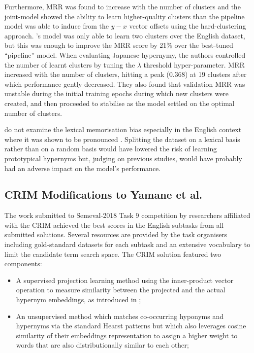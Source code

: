 Furthermore, \ac{MRR} was found to increase with the number of clusters and the joint-model showed the ability to learn higher-quality clusters than the pipeline model was able to induce from the $y-x$ vector offsets using the hard-clustering approach.  \citeauthor{yamane2016distributional}'s model was only able to learn two clusters over the English dataset, but this was enough to improve the \ac{MRR} score by 21\% over the best-tuned “pipeline” model.  When evaluating Japanese hypernymy, the authors controlled the number of learnt clusters by tuning the $\lambda$ threshold hyper-parameter.  \ac{MRR} increased with the number of clusters, hitting a peak (0.368) at 19 clusters after which performance gently decreased.  They also found that validation \ac{MRR} was unstable during the initial training epochs during which new clusters were created, and then proceeded to stabilise as the model settled on the optimal number of clusters.

\citeauthor{yamane2016distributional} do not examine the lexical memorisation bias especially in the English context where it was shown to be pronounced \citep{levy2015supervised, shwartz2017siege}.  Splitting the dataset on a lexical basis rather than on a random basis would have lowered the risk of learning prototypical hypernyms but, judging on previous studies, would have probably had an adverse impact on the model’s performance.

\subsection{CRIM Modifications to Yamane et al.} \label{CRIM}
The work submitted to Semeval-2018 Task 9 competition \citep{camacho2018semeval} by researchers affiliated with the \ac{CRIM} achieved the best scores in the English subtasks from all submitted solutions.  Several resources are provided by the task organisers including gold-standard datasets for each subtask and an extensive vocabulary to limit the candidate term search space.  The CRIM solution featured two components:
\begin{itemize}
    \item A supervised projection learning method using the inner-product vector operation to measure similarity between the projected and the actual hypernym embeddings, as introduced in \citep{yamane2016distributional};
    \item An unsupervised method which matches co-occurring hyponyms and hypernyms via the standard Hearst patterns \citep{hearst1992automatic} but which also leverages cosine similarity of their embeddings representation to assign a higher weight to words that are also distributionally similar to each other;
\end{itemize}

